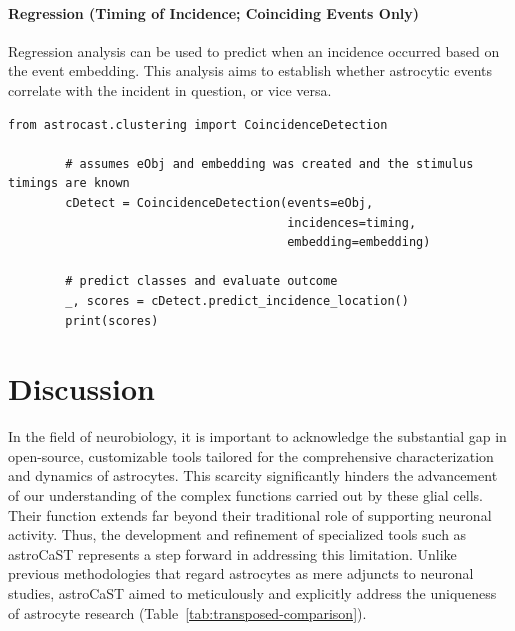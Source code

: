 \documentclass[utf8]{FrontiersinHarvard}
\newcommand{\tref}[1]{ (Table~\ref{tab:#1})}
\begin{document}
    \paragraph{Regression (Timing of Incidence; Coinciding Events Only)}
    Regression analysis can be used to predict when an incidence occurred based on the event embedding. This analysis aims to establish whether astrocytic events correlate with the incident in question, or vice versa.

    \begin{lstlisting}[style=pyStyle]
        from astrocast.clustering import CoincidenceDetection

        # assumes eObj and embedding was created and the stimulus timings are known
        cDetect = CoincidenceDetection(events=eObj,
                                       incidences=timing,
                                       embedding=embedding)

        # predict classes and evaluate outcome
        _, scores = cDetect.predict_incidence_location()
        print(scores)
    \end{lstlisting}


    \section{Discussion}

    In the field of neurobiology, it is important to acknowledge the substantial gap in open-source, customizable tools tailored for the comprehensive characterization and dynamics of astrocytes. This scarcity significantly hinders the advancement of our understanding of the complex functions carried out by these glial cells. Their function extends far beyond their traditional role of supporting neuronal activity\citep{montalant_role_2021,ransom_new_2003}. Thus, the development and refinement of specialized tools such as astroCaST represents a step forward in addressing this limitation. Unlike previous methodologies that regard astrocytes as mere adjuncts to neuronal studies, astroCaST aimed to meticulously and explicitly address the uniqueness of astrocyte research\tref{transposed-comparison}.
\end{document}
